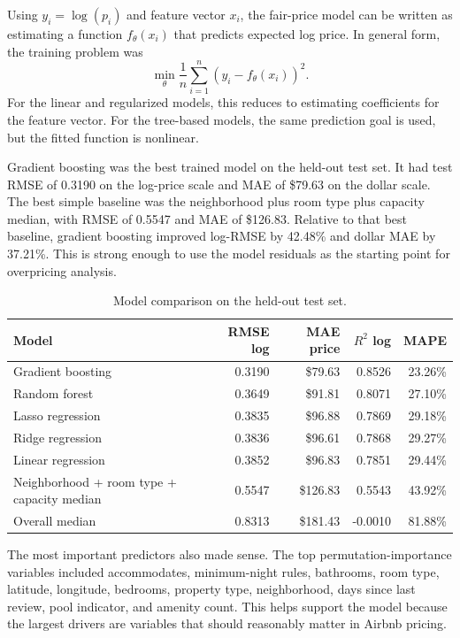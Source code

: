 \documentclass[11pt]{article}
\begin{document}
Using $y_i=\log(p_i)$ and feature vector $x_i$, the fair-price model can be written as estimating a function $f_\theta(x_i)$ that predicts expected log price. In general form, the training problem was
\[
    \min_{\theta} \frac{1}{n} \sum_{i=1}^{n} \left(y_i - f_\theta(x_i)\right)^2.
\]
For the linear and regularized models, this reduces to estimating coefficients for the feature vector. For the tree-based models, the same prediction goal is used, but the fitted function is nonlinear.

Gradient boosting was the best trained model on the held-out test set. It had test RMSE of 0.3190 on the log-price scale and MAE of \$79.63 on the dollar scale. The best simple baseline was the neighborhood plus room type plus capacity median, with RMSE of 0.5547 and MAE of \$126.83. Relative to that best baseline, gradient boosting improved log-RMSE by 42.48\% and dollar MAE by 37.21\%. This is strong enough to use the model residuals as the starting point for overpricing analysis.

\begin{table}[H]
\centering
\caption{Model comparison on the held-out test set.}
\small
\begin{tabular}{L{0.43\textwidth}rrrr}
\toprule
Model & RMSE log & MAE price & $R^2$ log & MAPE \\
\midrule
Gradient boosting & 0.3190 & \$79.63 & 0.8526 & 23.26\% \\
Random forest & 0.3649 & \$91.81 & 0.8071 & 27.10\% \\
Lasso regression & 0.3835 & \$96.88 & 0.7869 & 29.18\% \\
Ridge regression & 0.3836 & \$96.61 & 0.7868 & 29.27\% \\
Linear regression & 0.3852 & \$96.83 & 0.7851 & 29.44\% \\
Neighborhood + room type + capacity median & 0.5547 & \$126.83 & 0.5543 & 43.92\% \\
Overall median & 0.8313 & \$181.43 & -0.0010 & 81.88\% \\
\bottomrule
\end{tabular}
\end{table}

The most important predictors also made sense. The top permutation-importance variables included accommodates, minimum-night rules, bathrooms, room type, latitude, longitude, bedrooms, property type, neighborhood, days since last review, pool indicator, and amenity count. This helps support the model because the largest drivers are variables that should reasonably matter in Airbnb pricing.
\end{document}
